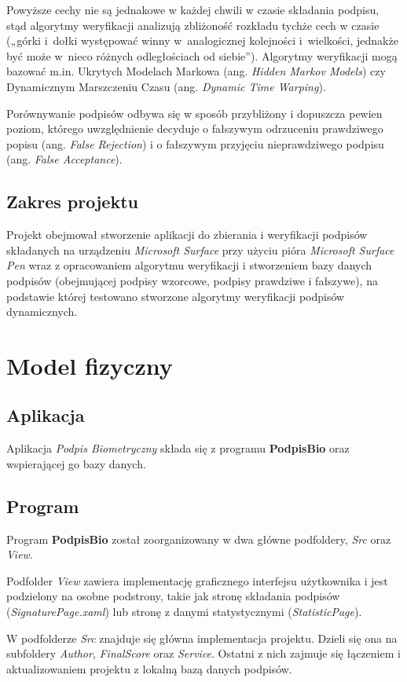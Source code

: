\documentclass[notitlepage, oneside]{report}
\begin{document}
 Powyższe cechy nie są jednakowe w każdej chwili w czasie składania podpisu, stąd algorytmy weryfikacji analizują zbliżoność rozkładu tychże cech w czasie („górki i dołki występować winny w analogicznej kolejności i wielkości, jednakże być może w nieco różnych odległościach od siebie”). Algorytmy weryfikacji mogą bazować m.in. Ukrytych Modelach Markowa (ang. \textit{Hidden Markov Models}) czy Dynamicznym Marszczeniu Czasu (ang. \textit{Dynamic Time Warping}).

 Porównywanie podpisów odbywa się w sposób przybliżony i dopuszcza pewien poziom, którego uwzględnienie decyduje o fałszywym odrzuceniu prawdziwego popisu (ang. \textit{False Rejection}) i o fałszywym przyjęciu nieprawdziwego podpisu (ang. \textit{False Acceptance}).
\section*{Zakres projektu}
Projekt obejmował stworzenie aplikacji do zbierania i weryfikacji podpisów składanych na urządzeniu \textit{Microsoft Surface} przy użyciu pióra \textit{Microsoft Surface Pen} wraz z opracowaniem algorytmu weryfikacji i stworzeniem bazy danych podpisów (obejmującej podpisy wzorcowe, podpisy prawdziwe i fałszywe), na podstawie której testowano stworzone algorytmy weryfikacji podpisów dynamicznych.

\chapter*{Model fizyczny}
\section*{Aplikacja}
Aplikacja \textit{Podpis Biometryczny} składa się z programu \textbf{PodpisBio} oraz wspierającej go bazy danych.
\section*{Program}
     Program \textbf{PodpisBio} został zoorganizowany w dwa główne podfoldery, \textit{Src} oraz \textit{View}.
     
     Podfolder \textit{View} zawiera implementację graficznego interfejsu użytkownika i jest podzielony na osobne podstrony, takie jak stronę składania podpisów (\textit{SignaturePage.xaml}) lub stronę z danymi statystycznymi (\textit{StatisticPage}).
     
 W podfolderze \textit{Src} znajduje się główna implementacja projektu. Dzieli się ona na subfoldery \textit{Author}, \textit{FinalScore} oraz \textit{Service}. Ostatni z nich zajmuje się łączeniem i aktualizowaniem projektu z lokalną bazą danych podpisów.
 
\end{document}
